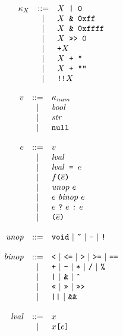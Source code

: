 \documentclass{article}
\newcommand{\ternary}[3]{{#1}\ \mathjs{?}\ {#2}\ \mathjs{:}\ {#3}}
\newcommand{\funcall}[2]{{#1}\mathjs{(}{#2}\mathjs{)}}
\newcommand{\paren}[1]{\mathjs{(}{#1}\mathjs{)}}
\newcommand{\seq}[1]{\overline{{#1}}}
\newcommand{\mathjs}[1]{\mbox{\texttt{{#1}}}}
\newcommand{\getprop}[2]{{#1}\mathjs{[}{#2}\mathjs{]}}
\begin{document}
\[
\begin{array}{rcl}
\kappa_X & ::= & X \mathjs{ | 0} \\
         &  |  & X \mathjs{ \& 0xff} \\
         &  |  & X \mathjs{ \& 0xffff} \\
         &  |  & X \mathjs{ >>> 0} \\
         &  |  & \mathjs{+}X \\
         &  |  & X \mathjs{ + ''} \\
         &  |  & X \mathjs{ + ""} \\
         &  |  & \mathjs{!!}X \\
\end{array}
\]

\[
\begin{array}{rcl}
v & ::= & \kappa_{\mathit{num}} \\
  &  |  & \mathit{bool} \\
  &  |  & \mathit{str} \\
  &  |  & \mathjs{null} \\
\\
e & ::= & v \\
  &  |  & \mathit{lval} \\
  &  |  & \mathit{lval}\mathjs{ = }e \\
  &  |  & \funcall{f}{\seq{e}} \\
  &  |  & \mathit{unop}\ e \\
  &  |  & e\ \mathit{binop}\ e \\
  &  |  & \ternary{e}{e}{e} \\
  &  |  & \paren{\seq{e}} \\
\\
\mathit{unop} & ::= & \mathjs{void} ~|~ \mathjs{\~{}} ~|~ \mathjs{-} ~|~ \mathjs{!} \\
\\
\mathit{binop} & ::= & \mathjs{<} ~|~ \mathjs{<=} ~|~ \mathjs{>} ~|~ \mathjs{>=} ~|~ \mathjs{==} \\
               &  |  & \mathjs{+} ~|~ \mathjs{-} ~|~ \mathjs{*} ~|~ \mathjs{/} ~|~ \mathjs{\%} \\
               &  |  & \mathjs{|} ~|~ \mathjs{\&} ~|~ \mathjs{\^{}} \\
               &  |  & \mathjs{<<} ~|~ \mathjs{>>} ~|~ \mathjs{>>>} \\
               &  |  & \mathjs{||} ~|~ \mathjs{\&\&} \\
\\
\mathit{lval} & ::= & x \\
              &  |  & \getprop{x}{e} \\
\end{array}
\]
\end{document}
